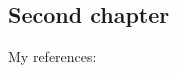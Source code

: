 \documentclass[../main]{subfiles}
\begin{document}
\begin{bibunit}
\chapter{Second chapter}

My references: \cite{B}

\end{bibunit}
\end{document}
